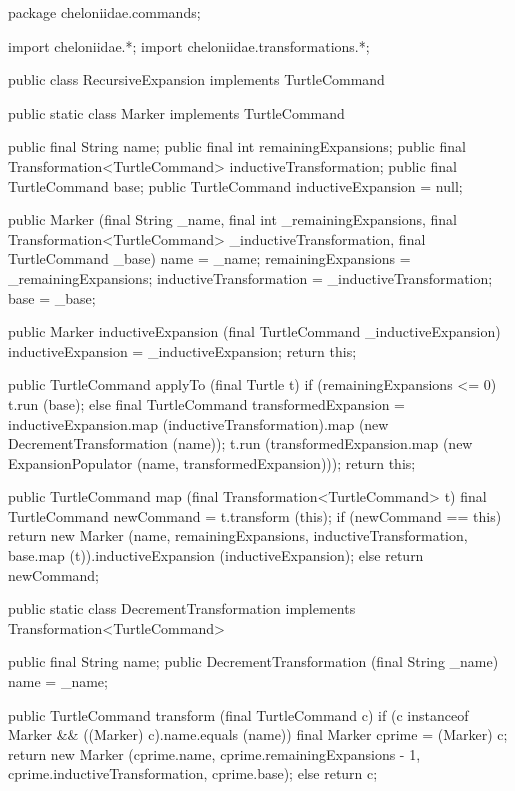 \documentclass{report}
\begin{document}
\begin{javacode}
package cheloniidae.commands;

import cheloniidae.*;
import cheloniidae.transformations.*;

public class RecursiveExpansion implements TurtleCommand {
  public static class Marker implements TurtleCommand {
    public final String                        name;
    public final int                           remainingExpansions;
    public final Transformation<TurtleCommand> inductiveTransformation;
    public final TurtleCommand                 base;
    public       TurtleCommand                 inductiveExpansion = null;

    public Marker (final String _name, final int _remainingExpansions,
                   final Transformation<TurtleCommand> _inductiveTransformation, final TurtleCommand _base)
      {name                    = _name;                    remainingExpansions = _remainingExpansions;
       inductiveTransformation = _inductiveTransformation; base                = _base;}

    public Marker inductiveExpansion (final TurtleCommand _inductiveExpansion) {
      inductiveExpansion = _inductiveExpansion;
      return this;
    }

    public TurtleCommand applyTo (final Turtle t) {
      if (remainingExpansions <= 0) t.run (base);
      else {
        final TurtleCommand transformedExpansion =
          inductiveExpansion.map (inductiveTransformation).map (new DecrementTransformation (name));
        t.run (transformedExpansion.map (new ExpansionPopulator (name, transformedExpansion)));
      }
      return this;
    }

    public TurtleCommand map (final Transformation<TurtleCommand> t) {
      final TurtleCommand newCommand = t.transform (this);
      if (newCommand == this)
        return new Marker (name, remainingExpansions,
                           inductiveTransformation, base.map (t)).inductiveExpansion (inductiveExpansion);
      else
        return newCommand;
    }
  }

  public static class DecrementTransformation implements Transformation<TurtleCommand> {
    public final String name;
    public DecrementTransformation (final String _name) {name = _name;}

    public TurtleCommand transform (final TurtleCommand c) {
      if (c instanceof Marker && ((Marker) c).name.equals (name)) {
        final Marker cprime = (Marker) c;
        return new Marker (cprime.name, cprime.remainingExpansions - 1, cprime.inductiveTransformation, cprime.base);
      } else return c;
    }
  }

}
\end{javacode}
\end{document}
